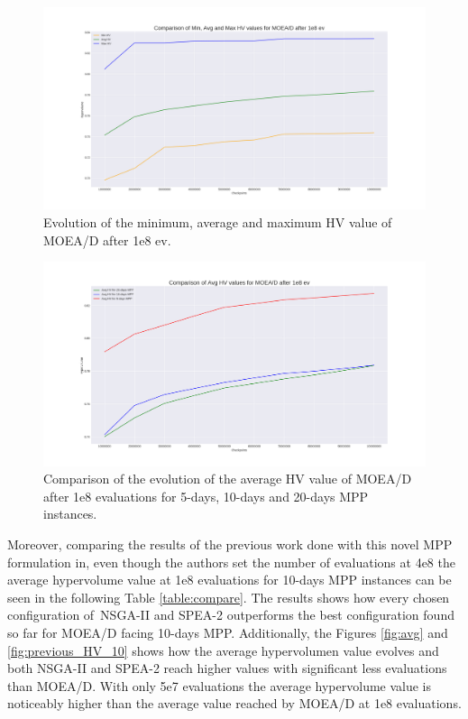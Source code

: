 \begin{figure}[H]
\centering
\includegraphics[scale=0.35]{../experiments/plots/minHV_avgHV_maxHV_evolution_10_days.png}
\caption{Evolution of the minimum, average and maximum HV value of MOEA/D after 1e8 ev.}
\label{fig:average}
\end{figure}

\begin{figure}[H]
\centering
\includegraphics[scale=0.35]{../experiments/plots/avgHV_evolution_5_vs_10_vs_20_days.png}
\caption{Comparison of the evolution of the average HV value of MOEA/D after 1e8 evaluations for 5-days, 10-days and 20-days MPP instances.}
\label{fig:comare}
\end{figure}


Moreover, comparing the results of the previous work done with this novel MPP formulation in\cite{Miranda2018}, even though the authors set the number of evaluations at 4e8 the average hypervolume value at 1e8 evaluations for 10-days MPP instances can be seen in the following Table \ref{table:compare}. The results shows how every chosen configuration of~NSGA-II and SPEA-2 outperforms the best configuration found so far for MOEA/D facing 10-days MPP. Additionally, the Figures \ref{fig:avg} and \ref{fig:previous_HV_10} shows how the average hypervolumen value evolves and both NSGA-II and SPEA-2 reach higher values with significant less evaluations than MOEA/D. With only 5e7 evaluations the average hypervolume value is noticeably higher than the average value reached by MOEA/D at 1e8 evaluations.


